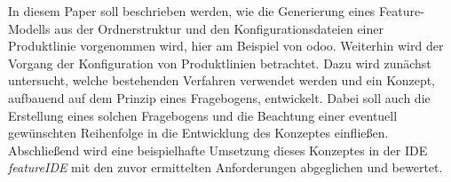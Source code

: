 In diesem Paper soll beschrieben werden, wie die Generierung eines Feature-Modells aus der Ordnerstruktur und den Konfigurationsdateien einer Produktlinie vorgenommen wird, hier am Beispiel von odoo.
Weiterhin wird der Vorgang der Konfiguration von Produktlinien betrachtet. Dazu wird zun\"achst untersucht, welche bestehenden Verfahren verwendet werden und ein Konzept, aufbauend auf dem Prinzip eines Fragebogens, entwickelt. Dabei soll auch die Erstellung eines solchen Fragebogens und die Beachtung einer eventuell gew\"unschten Reihenfolge in die Entwicklung des Konzeptes einflie\ss en.
Abschlie\ss end wird eine beispielhafte Umsetzung dieses Konzeptes in der IDE \textit{featureIDE} mit den zuvor ermittelten Anforderungen abgeglichen und bewertet.